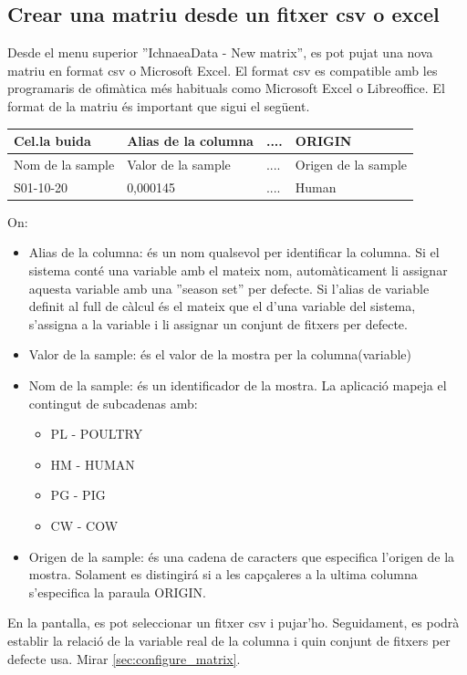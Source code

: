 \begin{itemize}
\subsection{Crear una matriu desde un fitxer csv o excel}
\label{sec:create_matrix}
Desde el menu superior ''IchnaeaData - New matrix'', es pot pujat una nova matriu en format csv o Microsoft Excel. El format csv es compatible amb les programaris de ofim\`{a}tica m\'{e}s habituals como Microsoft Excel o Libreoffice.
El format de la matriu \'{e}s important que sigui el següent.
\begin{center}
    \begin{tabular}{ | l | l | l | p{5cm} |}
    \hline
    Cel.la buida & Alias de la columna & .... & ORIGIN \\ \hline
    Nom de la sample & Valor de la sample  & .... & Origen de la sample \\ \hline
    S01-10-20        & 0,000145            & .... & Human \\ \hline
    \hline
    \end{tabular}
\end{center}
On:
\begin{itemize}
\item Alias de la columna: \'{e}s un nom qualsevol per identificar la columna. Si el sistema cont\'{e} una variable amb el mateix nom, autom\`{a}ticament li assignar aquesta variable amb una ''season set'' per defecte. Si l'alias de variable definit al full de c\`{a}lcul \'{e}s el mateix que el d'una variable del sistema, s'assigna a la variable i li assignar un conjunt de fitxers per defecte.
\item Valor de la sample: \'{e}s el valor de la mostra per la columna(variable)
\item Nom de la sample: \'{e}s un identificador de la mostra. La aplicaci\'{o} mapeja el contingut de subcadenas amb:
\begin{itemize}
\item PL - POULTRY
\item HM - HUMAN
\item PG - PIG
\item CW - COW
\end{itemize}
\item Origen de la sample: \'{e}s una cadena de caracters que especifica l'origen de la mostra. Solament es distingir\'{a} si a les capçaleres a la ultima columna s'especifica la paraula ORIGIN.
\end{itemize}
En la pantalla, es pot seleccionar un fitxer csv i pujar'ho. Seguidament, es podr\`{a} establir la relaci\'{o} de la variable real de la columna i quin conjunt de fitxers per defecte usa. Mirar \ref{sec:configure_matrix}.


\end{itemize}
